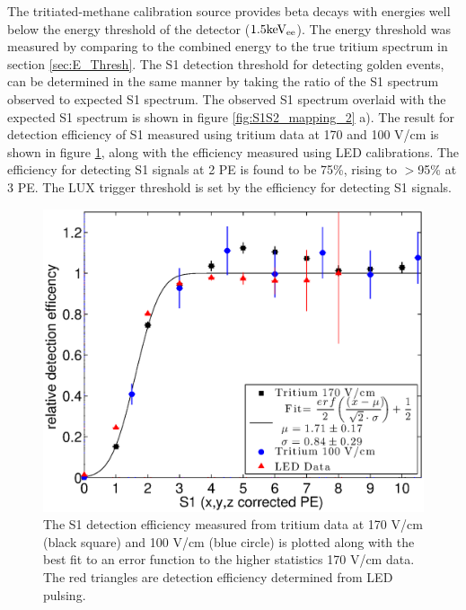 The tritiated-methane calibration source provides beta decays with energies well below the energy threshold of the detector ($\rm 1.5 keV_{ee}$). The energy threshold was measured by comparing to the combined energy to the true tritium spectrum in section \ref{sec:E_Thresh}. The S1 detection threshold for detecting golden events, can be determined in the same manner by taking the ratio of the S1 spectrum observed to expected S1 spectrum. The observed S1 spectrum overlaid with the expected S1 spectrum is shown in figure \ref{fig:S1S2_mapping_2} a). The result for detection efficiency of S1 measured using tritium data at 170 and 100 V/cm is shown in figure \ref{fig:S1_Thresh}, along with the efficiency measured using LED calibrations. The efficiency for detecting S1 signals at 2 PE is found to be 75\%, rising to $>$95\% at 3 PE. The LUX trigger threshold is set by the efficiency for detecting S1 signals.

\renewcommand{\baselinestretch}{1}
\small\normalsize
\begin{figure}[h!]\centering
\includegraphics[width=120mm]{Chapter_T/Figures/Threshold/S1_thresh_iter1_led.eps}
\caption{The S1 detection efficiency measured from tritium data at 170 V/cm (black square) and 100 V/cm (blue circle) is plotted along with the best fit to an error function to the higher statistics 170 V/cm data. The red triangles are detection efficiency determined from LED pulsing. }
\label{fig:S1_Thresh}
\end{figure}
\renewcommand{\baselinestretch}{2}
\small\normalsize

